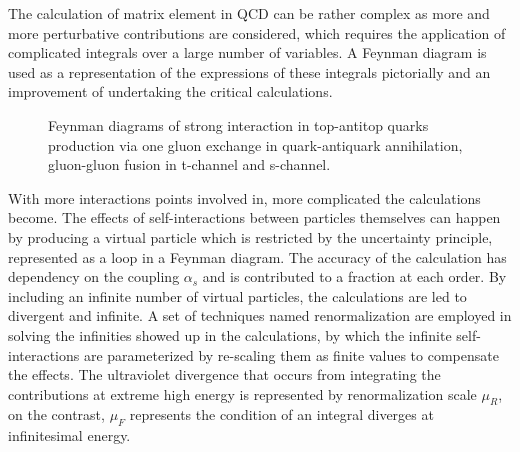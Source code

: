 \documentclass[UTF8,12pt]{ctexart}
\numberwithin{equation}{section}
\begin{document}
The calculation of matrix element in QCD can be rather complex as more and more perturbative contributions are considered, which requires the application of complicated integrals over a large number of variables. A Feynman diagram is used as a representation of the expressions of these integrals pictorially and an improvement of undertaking the critical calculations.

\begin{figure}[htb] 
	\centering  
 	\caption{Feynman diagrams of strong interaction in top-antitop quarks production via  one gluon exchange in quark-antiquark annihilation, gluon-gluon fusion in  t-channel and  s-channel.}
\end{figure}

With more interactions points involved in, more complicated the calculations become. The effects of self-interactions between particles themselves can happen by producing a virtual particle which is restricted by the uncertainty principle, represented as a loop in a Feynman diagram. The accuracy of the calculation has dependency on the coupling $\alpha_{s}$ and is contributed to a fraction at each order. By including an infinite number of virtual particles, the calculations are led to divergent and infinite.
A set of techniques named renormalization are employed in solving the infinities showed up in the calculations, by which the infinite self-interactions are parameterized by re-scaling them as finite values to compensate the effects. The ultraviolet divergence that occurs from integrating the contributions at extreme high energy is represented by renormalization scale $\mu_R$, on the contrast,  $\mu_F$ represents the condition of an integral diverges at infinitesimal energy.
\end{document}

